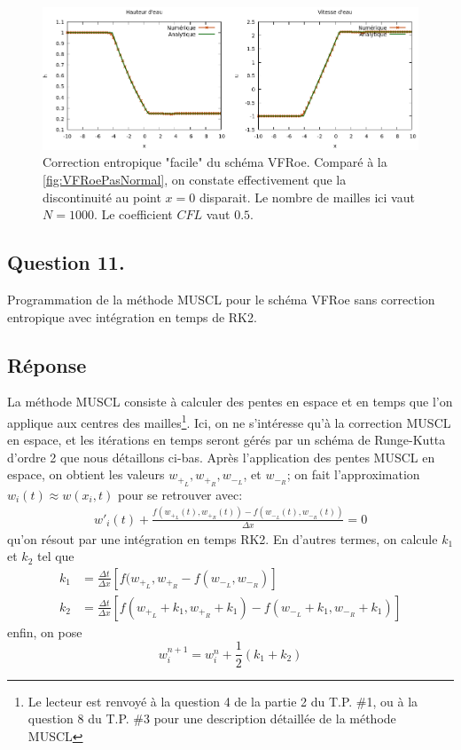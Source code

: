 \documentclass[
	french,
	11pt, %
]{fphw}
\begin{document}
\begin{figure}[H]
	\centering
	\includegraphics[width=\textwidth]{VFRoeCorrrectionEntropique.png}
	\caption{Correction entropique "facile" du schéma VFRoe. Comparé à la \cref{fig:VFRoePasNormal}, on constate effectivement que la discontinuité au point $x=0$ disparait. Le nombre de mailles ici vaut $N=1000$. Le coefficient $CFL$ vaut $0.5$.}
	\label{fig:VFRoeEntropique}
\end{figure}




\subsection*{Question 11.}
\begin{problem}
	Programmation de la méthode MUSCL pour le schéma VFRoe sans correction entropique avec intégration en temps de RK2.
\end{problem}

\subsection*{Réponse} 

La méthode MUSCL consiste à calculer des pentes en espace et en temps que l'on applique aux centres des mailles\footnote{Le lecteur est renvoyé à la question 4 de la partie 2 du T.P. \#1, ou à la question 8 du T.P. \#3 pour une description détaillée de la méthode MUSCL}. Ici, on ne s'intéresse qu'à la correction MUSCL en espace, et les itérations en temps seront gérés par un schéma de Runge-Kutta d'ordre 2 que nous détaillons ci-bas. Après l'application des pentes MUSCL en espace, on obtient les valeurs $w_{+_L},w_{+_R},w_{-_L}$, et $w_{-_R}$; on fait l'approximation $w_i(t) \approx w(x_i,t)$ pour se retrouver avec:
\begin{align*}
	w'_i(t) + \frac{f(w_{+_{L}}(t),w_{+_{R}}(t)) - f(w_{-_L}(t),w_{-_R}(t))}{\Delta x} = 0
\end{align*}
qu'on résout par une intégration en temps RK2. En d'autres termes, on calcule $k_1$ et $k_2$ tel que 
\begin{align*}
	k_1 &= \frac{\Delta t}{\Delta x} \left[ f(w_{+_{L}},w_{+_{R}} - f(w_{-_L},w_{-_R}) \right]\\
	k_2 &= \frac{\Delta t}{\Delta x} \left[  f(w_{+_{L}}+k_1,w_{+_{R}}+k_1) - f(w_{-_L}+k_1,w_{-_R}+k_1) \right]
\end{align*}
enfin, on pose
$$
w^{n+1}_i = w^{n}_i + \frac{1}{2}(k_1 + k_2)
$$
\end{document}
